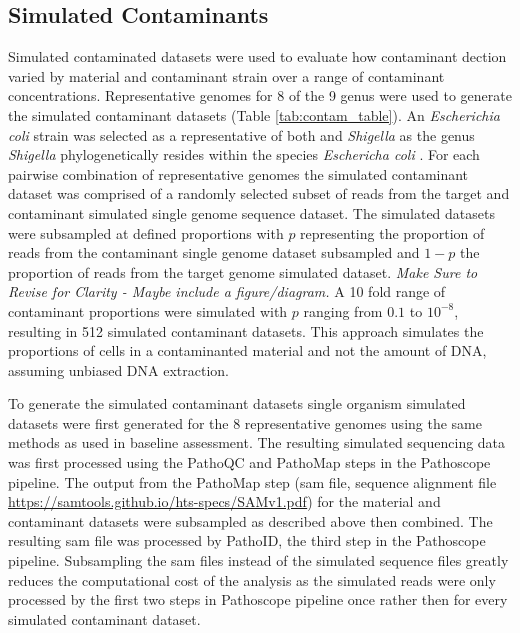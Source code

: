 \documentclass[fleqn,10pt,lineno]{wlpeerj}\usepackage[]{graphicx}\usepackage[]{color}
\begin{document}
\subsection*{Simulated Contaminants}
Simulated contaminated datasets were used to evaluate how contaminant dection varied by material and contaminant strain over a range of contaminant concentrations.
Representative genomes for 8 of the 9 genus were used to generate the simulated contaminant datasets (Table \ref{tab:contam_table}).
An \textit{Escherichia coli} strain was selected as a representative of both  and \textit{Shigella} as the genus \textit{Shigella} phylogenetically resides within the species \textit{Eschericha coli} \citep{lan2002escherichia}.
For each pairwise combination of representative genomes the simulated contaminant dataset was comprised of a randomly selected subset of reads from the target and contaminant simulated single genome sequence dataset.
The simulated datasets were subsampled at defined proportions with $p$ representing the proportion of reads from the contaminant single genome dataset subsampled and $1-p$ the proportion of reads from the target genome simulated dataset.
\textit{Make Sure to Revise for Clarity - Maybe include a figure/diagram.}
A 10 fold range of contaminant proportions were simulated with $p$ ranging from $0.1$ to $10^{-8}$, resulting in 512 simulated contaminant datasets.
This approach simulates the proportions of cells in a contaminanted material and not the amount of DNA, assuming unbiased DNA extraction.

To generate the simulated contaminant datasets single organism simulated datasets were first generated for the 8 representative genomes using the same methods as used in baseline assessment.
The resulting simulated sequencing data was first processed using the PathoQC and PathoMap steps in the Pathoscope pipeline.
The output from the PathoMap step (sam file, sequence alignment file \url{https://samtools.github.io/hts-specs/SAMv1.pdf}) for the material and contaminant datasets were subsampled as described above then combined. 
The resulting sam file was processed by PathoID, the third step in the Pathoscope pipeline.
Subsampling the sam files instead of the simulated sequence files greatly reduces the computational cost of the analysis as the simulated reads were only processed by the first two steps in Pathoscope pipeline once rather then for every simulated contaminant dataset.
\end{document}
